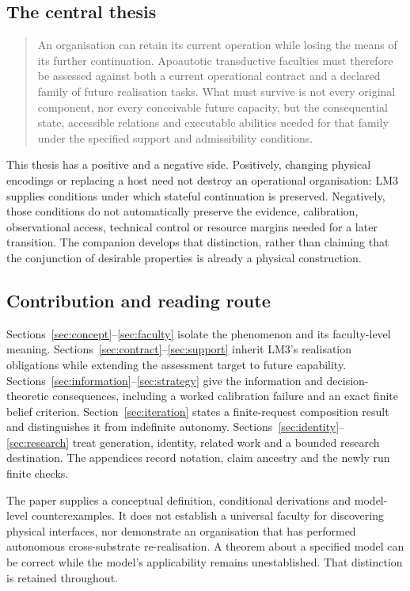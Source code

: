 \subsection{The central thesis}

\begin{quote}
An organisation can retain its current operation while losing the means of its further continuation. Apoautotic transductive faculties must therefore be assessed against both a current operational contract and a declared family of future realisation tasks. What must survive is not every original component, nor every conceivable future capacity, but the consequential state, accessible relations and executable abilities needed for that family under the specified support and admissibility conditions.
\end{quote}

This thesis has a positive and a negative side. Positively, changing physical encodings or replacing a host need not destroy an operational organisation: LM3 supplies conditions under which stateful continuation is preserved. Negatively, those conditions do not automatically preserve the evidence, calibration, observational access, technical control or resource margins needed for a later transition. The companion develops that distinction, rather than claiming that the conjunction of desirable properties is already a physical construction.

\subsection{Contribution and reading route}

Sections~\ref{sec:concept}--\ref{sec:faculty} isolate the phenomenon and its faculty-level meaning. Sections~\ref{sec:contract}--\ref{sec:support} inherit LM3's realisation obligations while extending the assessment target to future capability. Sections~\ref{sec:information}--\ref{sec:strategy} give the information and decision-theoretic consequences, including a worked calibration failure and an exact finite belief criterion. Section~\ref{sec:iteration} states a finite-request composition result and distinguishes it from indefinite autonomy. Sections~\ref{sec:identity}--\ref{sec:research} treat generation, identity, related work and a bounded research destination. The appendices record notation, claim ancestry and the newly run finite checks.

The paper supplies a conceptual definition, conditional derivations and model-level counterexamples. It does not establish a universal faculty for discovering physical interfaces, nor demonstrate an organisation that has performed autonomous cross-substrate re-realisation. A theorem about a specified model can be correct while the model's applicability remains unestablished. That distinction is retained throughout.

